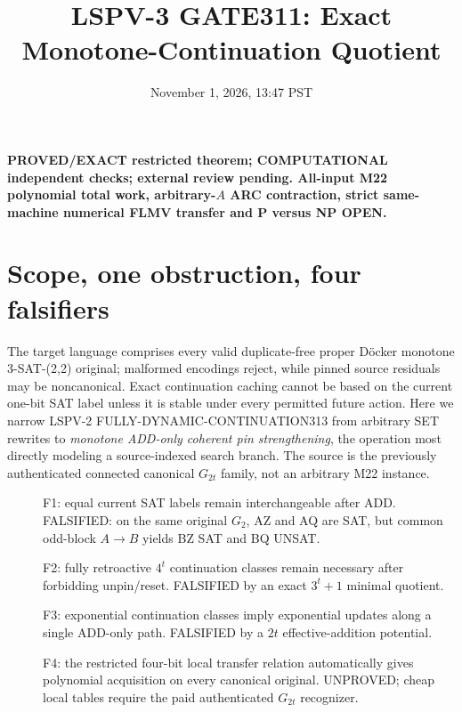 \documentclass[11pt]{article}
\title{LSPV-3 GATE311: Exact Monotone-Continuation Quotient}
\date{November 1, 2026, 13:47 PST}
\begin{document}
\maketitle
\noindent\textbf{PROVED/EXACT restricted theorem; COMPUTATIONAL independent checks; external review pending. All-input M22 polynomial total work, arbitrary-$A$ ARC contraction, strict same-machine numerical FLMV transfer and P versus NP OPEN.}
\section{Scope, one obstruction, four falsifiers}
The target language comprises every valid duplicate-free proper D\"ocker monotone 3-SAT-(2,2) original; malformed encodings reject, while pinned source residuals may be noncanonical. Exact continuation caching cannot be based on the current one-bit SAT label unless it is stable under every permitted future action. Here we narrow LSPV-2 FULLY-DYNAMIC-CONTINUATION313 from arbitrary SET rewrites to \emph{monotone ADD-only coherent pin strengthening}, the operation most directly modeling a source-indexed search branch. The source is the previously authenticated connected canonical $G_{2t}$ family, not an arbitrary M22 instance.

\begin{description}
\item[] F1: equal current SAT labels remain interchangeable after ADD. FALSIFIED: on the same original $G_2$, AZ and AQ are SAT, but common odd-block $A\to B$ yields BZ SAT and BQ UNSAT.
\item[] F2: fully retroactive $4^t$ continuation classes remain necessary after forbidding unpin/reset. FALSIFIED by an exact $3^t+1$ minimal quotient.
\item[] F3: exponential continuation classes imply exponential updates along a single ADD-only path. FALSIFIED by a $2t$ effective-addition potential.
\item[] F4: the restricted four-bit local transfer relation automatically gives polynomial acquisition on every canonical original. UNPROVED; cheap local tables require the paid authenticated $G_{2t}$ recognizer.
\end{description}
\end{document}
